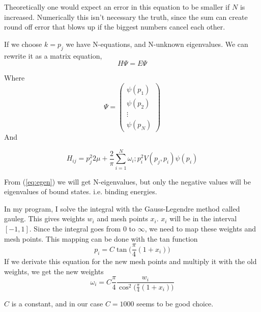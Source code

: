 Theoretically one would expect an error in this equation to be smaller if $N$ is increased. Numerically this isn't necessary
the truth,
since the sum can create round off error that blows up if the biggest numbers cancel each other.

If we choose $k=p_j$ we have N-equations, and N-unknown eigenvalues. We can rewrite it as a matrix equation,
\begin{equation}\label{eq:egen}
H{\Psi}=E{\Psi}
\end{equation}

Where
\begin{equation}
{\Psi}=
\left( \begin{array}{c}
{\psi}(p_1)\\
{\psi}(p_2)\\
\vdots\\
{\psi}(p_N)
\end{array}\right)
\end{equation}
And

\begin{equation}
H_{ij}={p_{j}^2}{2\mu}+\frac{2}{\pi}\sum^N_{i=1}\omega_i;p^2_i  V({ p_j},{ p_i})\psi({ p_i})
\end{equation}

From (\ref{eq:egen}) we will get N-eigenvalues, but only the negative values will be eigenvalues of bound states. i.e. 
binding energies. 

In my program, I solve the integral with the Gauss-Legendre method called gauleg. This gives weights $w_i$ and mesh points $x_i$.
$x_i$ will be
in the interval $[-1,1]$. Since the integral goes from $0$ to $\infty$, we need to map these weights and mesh points. This mapping
can be done with the tan function 
\begin{equation}
p_i=C\tan\bigg(\frac{\pi}{4}(1+x_i)\bigg)
\end{equation}
If we derivate this equation for the new mesh points and multiply it with the old weights, we get the new weights
\begin{equation}
\omega_i=C\frac{\pi}{4}\frac{w_i}{\cos ^2\big(\frac{\pi}{4}(1+x_i)\big)}
\end{equation}

$C$ is  a constant, and in our case $C=1000$ seems to be good choice. 

